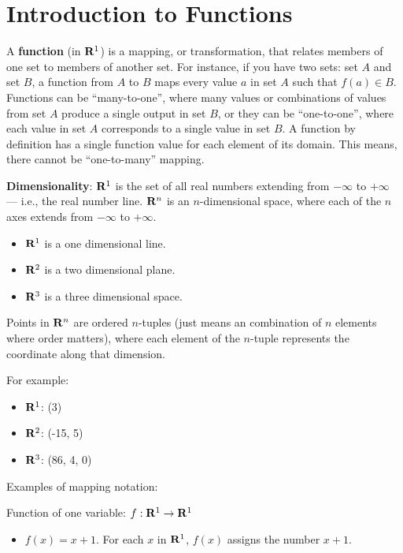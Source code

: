 \documentclass[]{book}
\providecommand{\tightlist}{%
  \setlength{\itemsep}{0pt}\setlength{\parskip}{0pt}}
\theoremstyle{definition}
\theoremstyle{definition}
\theoremstyle{definition}
\theoremstyle{remark}
\begin{document}
\hypertarget{introduction-to-functions}{%
\section{Introduction to Functions}\label{introduction-to-functions}}

A \textbf{function} (in \({\bf R}^1\)) is a mapping, or transformation, that relates members of one set to members of another set. For instance, if you have two sets: set \(A\) and set \(B\), a function from \(A\) to \(B\) maps every value \(a\) in set \(A\) such that \(f(a) \in B\). Functions can be ``many-to-one'', where many values or combinations of values from set \(A\) produce a single output in set \(B\), or they can be ``one-to-one'', where each value in set \(A\) corresponds to a single value in set \(B\). A function by definition has a single function value for each element of its domain. This means, there cannot be ``one-to-many'' mapping.

\textbf{Dimensionality}: \({\bf R}^1\) is the set of all real numbers extending from \(-\infty\) to \(+\infty\) --- i.e., the real number line. \({\bf R}^n\) is an \(n\)-dimensional space, where each of the \(n\) axes extends from \(-\infty\) to \(+\infty\).

\begin{itemize}
\tightlist
\item
  \({\bf R}^1\) is a one dimensional line.
\item
  \({\bf R}^2\) is a two dimensional plane.
\item
  \({\bf R}^3\) is a three dimensional space.
\end{itemize}

Points in \({\bf R}^n\) are ordered \(n\)-tuples (just means an combination of \(n\) elements where order matters), where each element of the \(n\)-tuple represents the coordinate along that dimension.

For example:

\begin{itemize}
\tightlist
\item
  \({\bf R}^1\): (3)
\item
  \({\bf R}^2\): (-15, 5)
\item
  \({\bf R}^3\): (86, 4, 0)
\end{itemize}

Examples of mapping notation:

Function of one variable: \(f:{\bf R}^1\to{\bf R}^1\)

\begin{itemize}
\tightlist
\item
  \(f(x)=x+1\). For each \(x\) in \({\bf R}^1\), \(f(x)\) assigns the number \(x+1\).
\end{itemize}
\end{document}
